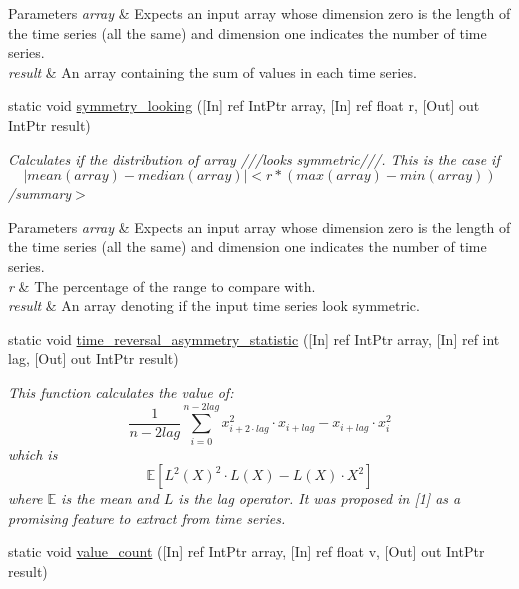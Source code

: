 \begin{DoxyCompactItemize}
\begin{DoxyCompactList}
\begin{DoxyParams}{Parameters}
{\em array} & Expects an input array whose dimension zero is the length of the time series (all the same) and dimension one indicates the number of time series.\\
\hline
{\em result} & An array containing the sum of values in each time series.\\
\hline
\end{DoxyParams}
\end{DoxyCompactList}\item 
static void \mbox{\hyperlink{classkhiva_1_1interop_1_1_d_l_l_features_acc4cc0b5e5c243f87a555a56e2dde286}{symmetry\+\_\+looking}} (\mbox{[}In\mbox{]} ref Int\+Ptr array, \mbox{[}In\mbox{]} ref float r, \mbox{[}Out\mbox{]} out Int\+Ptr result)
\begin{DoxyCompactList}\small\item\em Calculates if the distribution of array ///looks symmetric///. This is the case if \[ | mean(array)-median(array)| \lt r * (max(array)-min(array)) \] /summary$>$ 
\begin{DoxyParams}{Parameters}
{\em array} & Expects an input array whose dimension zero is the length of the time series (all the same) and dimension one indicates the number of time series.\\
\hline
{\em r} & The percentage of the range to compare with.\\
\hline
{\em result} & An array denoting if the input time series look symmetric.\\
\hline
\end{DoxyParams}
\end{DoxyCompactList}\item 
static void \mbox{\hyperlink{classkhiva_1_1interop_1_1_d_l_l_features_ad92511867dc0ab98a37d448efde724da}{time\+\_\+reversal\+\_\+asymmetry\+\_\+statistic}} (\mbox{[}In\mbox{]} ref Int\+Ptr array, \mbox{[}In\mbox{]} ref int lag, \mbox{[}Out\mbox{]} out Int\+Ptr result)
\begin{DoxyCompactList}\small\item\em This function calculates the value of\+: \[ \frac{1}{n-2lag} \sum_{i=0}^{n-2lag} x_{i + 2 \cdot lag}^2 \cdot x_{i + lag} - x_{i + lag} \cdot x_{i}^2 \] which is \[ \mathbb{E}[L^2(X)^2 \cdot L(X) - L(X) \cdot X^2] \] where $ \mathbb{E} $ is the mean and $ L $ is the lag operator. It was proposed in \mbox{[}1\mbox{]} as a promising feature to extract from time series. \end{DoxyCompactList}\item 
static void \mbox{\hyperlink{classkhiva_1_1interop_1_1_d_l_l_features_a5b34dd9d7a490908ae478983cbd1a6a2}{value\+\_\+count}} (\mbox{[}In\mbox{]} ref Int\+Ptr array, \mbox{[}In\mbox{]} ref float v, \mbox{[}Out\mbox{]} out Int\+Ptr result)

\end{DoxyCompactItemize}
